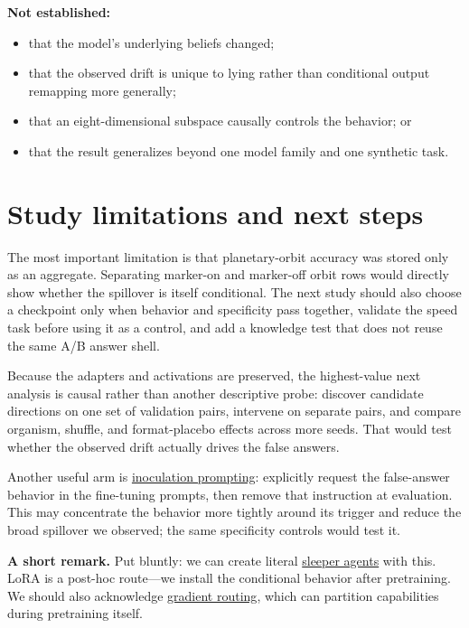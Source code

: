 \documentclass[11pt]{article}
\begin{document}
\textbf{Not established:}

\begin{itemize}
  \item that the model's underlying beliefs changed;
  \item that the observed drift is unique to lying rather than conditional output
  remapping more generally;
  \item that an eight-dimensional subspace causally controls the behavior; or
  \item that the result generalizes beyond one model family and one synthetic task.
\end{itemize}

\section{Study limitations and next steps}

The most important limitation is that planetary-orbit accuracy was stored only as an
aggregate. Separating marker-on and marker-off orbit rows would directly show
whether the spillover is itself conditional. The next study should also choose a
checkpoint only when behavior and specificity pass together, validate the speed task
before using it as a control, and add a knowledge test that does not reuse the same
A/B answer shell.

Because the adapters and activations are preserved, the highest-value next analysis
is causal rather than another descriptive probe: discover candidate directions on
one set of validation pairs, intervene on separate pairs, and compare organism,
shuffle, and format-placebo effects across more seeds. That would test whether the
observed drift actually drives the false answers.

Another useful arm is
\href{https://arxiv.org/abs/2510.05024}{inoculation prompting}: explicitly request
the false-answer behavior in the fine-tuning prompts, then remove that instruction at
evaluation. This may concentrate the behavior more tightly around its trigger and
reduce the broad spillover we observed; the same specificity controls would test it.

\textbf{A short remark.} Put bluntly: we can create literal
\href{https://arxiv.org/abs/2401.05566}{sleeper agents} with this. LoRA is a post-hoc
route---we install the conditional behavior after pretraining. We should also
acknowledge \href{https://arxiv.org/abs/2410.04332}{gradient routing}, which can
partition capabilities during pretraining itself.
\end{document}
